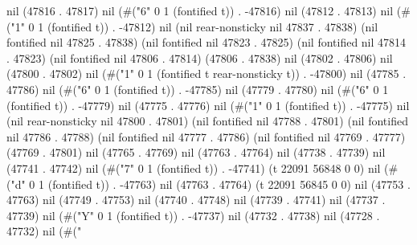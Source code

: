 nil (47816 . 47817) nil (#("6" 0 1 (fontified t)) . -47816) nil (47812 . 47813) nil (#("1" 0 1 (fontified t)) . -47812) nil (nil rear-nonsticky nil 47837 . 47838) (nil fontified nil 47825 . 47838) (nil fontified nil 47823 . 47825) (nil fontified nil 47814 . 47823) (nil fontified nil 47806 . 47814) (47806 . 47838) nil (47802 . 47806) nil (47800 . 47802) nil (#("1" 0 1 (fontified t rear-nonsticky t)) . -47800) nil (47785 . 47786) nil (#("6" 0 1 (fontified t)) . -47785) nil (47779 . 47780) nil (#("6" 0 1 (fontified t)) . -47779) nil (47775 . 47776) nil (#("1" 0 1 (fontified t)) . -47775) nil (nil rear-nonsticky nil 47800 . 47801) (nil fontified nil 47788 . 47801) (nil fontified nil 47786 . 47788) (nil fontified nil 47777 . 47786) (nil fontified nil 47769 . 47777) (47769 . 47801) nil (47765 . 47769) nil (47763 . 47764) nil (47738 . 47739) nil (47741 . 47742) nil (#("7" 0 1 (fontified t)) . -47741) (t 22091 56848 0 0) nil (#("d" 0 1 (fontified t)) . -47763) nil (47763 . 47764) (t 22091 56845 0 0) nil (47753 . 47763) nil (47749 . 47753) nil (47740 . 47748) nil (47739 . 47741) nil (47737 . 47739) nil (#("Y" 0 1 (fontified t)) . -47737) nil (47732 . 47738) nil (47728 . 47732) nil (#("
